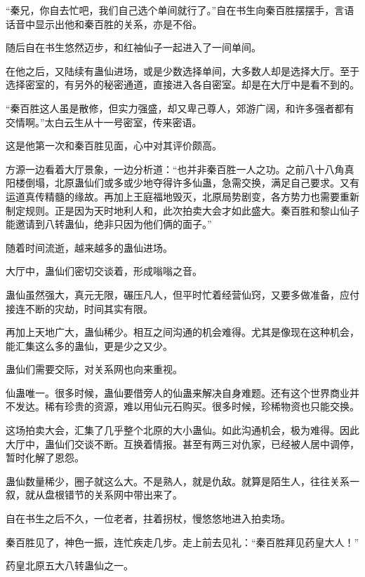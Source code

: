 
\begin{this_body}

“秦兄，你自去忙吧，我们自己选个单间就行了。”自在书生向秦百胜摆摆手，言语话音中显示出他和秦百胜的关系，亦是不俗。

随后自在书生悠然迈步，和红袖仙子一起进入了一间单间。

在他之后，又陆续有蛊仙进场，或是少数选择单间，大多数人却是选择大厅。至于选择密室的，有另外的秘密通道，直接进入各自密室。却是在大厅中是看不到的。

“秦百胜这人虽是散修，但实力强盛，却又卑己尊人，郊游广阔，和许多强者都有交情啊。”太白云生从十一号密室，传来密语。

这是他第一次和秦百胜见面，心中对其评价颇高。

方源一边看着大厅景象，一边分析道：“也并非秦百胜一人之功。之前八十八角真阳楼倒塌，北原蛊仙们或多或少地夺得许多仙蛊，急需交换，满足自己要求。又有运道真传精髓的缘故。再加上王庭福地毁灭，北原局势剧变，各方势力也需要重新制定规则。正是因为天时地利人和，此次拍卖大会才如此盛大。秦百胜和黎山仙子能邀请到八转蛊仙，绝非只因为他们俩的面子。”

随着时间流逝，越来越多的蛊仙进场。

大厅中，蛊仙们密切交谈着，形成嗡嗡之音。

蛊仙虽然强大，真元无限，碾压凡人，但平时忙着经营仙窍，又要多做准备，应付接连不断的灾劫，时间其实有限。

再加上天地广大，蛊仙稀少。相互之间沟通的机会难得。尤其是像现在这种机会，能汇集这么多的蛊仙，更是少之又少。

蛊仙们需要交际，对关系网也向来重视。

仙蛊唯一。很多时候，蛊仙要借旁人的仙蛊来解决自身难题。还有这个世界商业并不发达。稀有珍贵的资源，难以用仙元石购买。很多时候，珍稀物资也只能交换。

这场拍卖大会，汇集了几乎整个北原的大小蛊仙。如此沟通机会，极为难得。因此大厅中，蛊仙们交谈不断。互换着情报。甚至有两三对仇家，已经被人居中调停，暂时化解了恩怨。

蛊仙数量稀少，圈子就这么大。不是熟人，就是仇敌。就算是陌生人，往往关系一叙，就从盘根错节的关系网中带出来了。

自在书生之后不久，一位老者，拄着拐杖，慢悠悠地进入拍卖场。

秦百胜见了，神色一振，连忙疾走几步。走上前去见礼：“秦百胜拜见药皇大人！”

药皇北原五大八转蛊仙之一。


\end{this_body}

